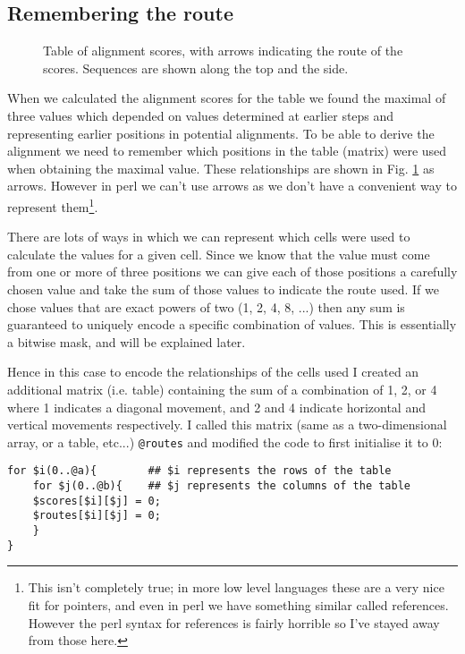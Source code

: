 \documentclass[11pt]{article}
\renewcommand\scriptsize\normalsize
\begin{document}
\subsection{Remembering the route}
\label{sec-1-2}
\begin{figure}[ht]
  \begin{tikzpicture}[scale=0.5]
    
  \end{tikzpicture}
  \caption{Table of alignment scores, with arrows indicating the route of the
    scores. Sequences are shown along the top and
    the side.}
  \label{routeMatrix}
\end{figure}

When we calculated the alignment scores for the table we found the maximal of
three values which depended on values determined at earlier steps and
representing earlier positions in potential alignments. To be able to derive
the alignment we need to remember which positions in the table (matrix)
were used when obtaining the maximal value. These relationships are shown in
Fig. \ref{routeMatrix} as arrows. However in perl we can't use arrows as we don't have a
convenient way to represent them\footnote{This isn't completely true; in more
  low level languages these are a very nice fit for pointers, and even in perl
  we have something similar called references. However the perl syntax for references is
  fairly horrible so I've stayed away from those here.}.

There are lots of ways in which we can represent which cells were used to
calculate the values for a given cell. Since we know that the value must come
from one or more of three positions we can give each of those positions a
carefully chosen value and take the sum of those values to indicate the route
used. If we chose values that are exact powers of two (1, 2, 4, 8, ...) then
any sum is guaranteed to uniquely encode a specific combination of
values. This is essentially a bitwise mask, and will be explained later.

Hence in this case to encode the relationships of the cells used I created an
additional matrix (i.e. table) containing the sum of a combination of 1, 2, or
4 where 1 indicates a diagonal movement, and 2 and 4 indicate horizontal and
vertical movements respectively. I called this matrix (same as a two-dimensional array, or
a table, etc...) \texttt{@routes} and modified the code to first initialise it
to 0:

\begin{verbatim}
for $i(0..@a){        ## $i represents the rows of the table
    for $j(0..@b){    ## $j represents the columns of the table
	$scores[$i][$j] = 0;
	$routes[$i][$j] = 0;
    }
}
\end{verbatim}
\end{document}
